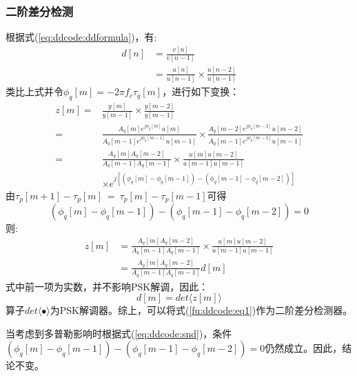 \subsubsection{二阶差分检测}
	根据式(\ref{eq:ddcode:ddformula})，有:
\begin{equation}
\begin{split}
	d[n]&=\frac{v[n]}{v[n-1]} \\
	    &=\frac{u[n]}{u[n-1]}\times\frac{u[n-2]}{u[n-1]}
\end{split}
\end{equation}
类比上式并令$\phi_q[m]=-2\pi f_c \tau_q[m]$，进行如下变换：
\begin{equation}
\label{fu:ddcode:eq1}
\begin{split}
	z[m]=&\frac{y[m]}{y[m-1]}\times\frac{y[m-2]}{y[m-1]} \\
	=&\frac{A_q[m]e^{j\phi_q[m]} u[m]}{A_q[m-1]e^{j\phi_q[m-1]} u[m-1]} \times \frac{A_q[m-2]e^{j\phi_q[m-2]} u[m-2]}{A_q[m-1]e^{j\phi_q[m-1]} u[m-1]} \\
	=&\frac{A_q[m]A_q[m-2]}{A_q[m-1]A_q[m-1]}\times\frac{u[m]u[m-2]}{u[m-1]u[m-1]} \\
	&\times e^{j\left[(\phi_q[m]-\phi_q[m-1]) - (\phi_q[m-1] - \phi_q[m-2])\right]}
\end{split}
\end{equation}
由$\tau_p[m+1] -\tau_p[m]~=~\tau_p[m]-\tau_p[m-1]$可得\[ (\phi_q[m]-\phi_q[m-1]) - (\phi_q[m-1] - \phi_q[m-2]) = 0 \]则:
\begin{equation}
\begin{split}
z[m]&=\frac{A_q[m]A_q[m-2]}{A_q[m-1]A_q[m-1]}\times\frac{u[m]u[m-2]}{u[m-1]u[m-1]} \\
    &=\frac{A_q[m]A_q[m-2]}{A_q[m-1]A_q[m-1]}d[m]
\end{split}
\end{equation}
式中前一项为实数，并不影响PSK解调，因此：
\begin{equation}
d[m]=det \langle z[m] \rangle
\end{equation}
算子$det\langle \bullet \rangle$为PSK解调器。综上，可以将式(\ref{fu:ddcode:eq1})作为二阶差分检测器。

当考虑到多普勒影响时根据式(\ref{eq:ddcode:snd})，条件$(\phi_q[m]-\phi_q[m-1]) - (\phi_q[m-1] - \phi_q[m-2]) = 0$仍然成立。因此，结论不变。






		
	